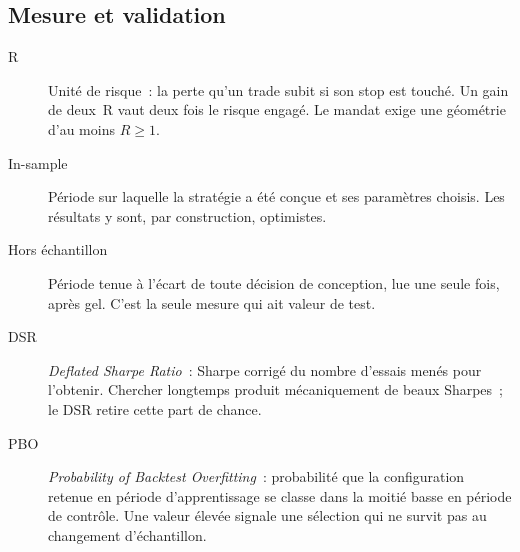\subsection{Mesure et validation}

\begin{description}
  \item[R] Unité de risque~: la perte qu'un trade subit si son stop est
  touché. Un gain de deux~R vaut deux fois le risque engagé. Le mandat exige
  une géométrie d'au moins $R \geq 1$.
  \item[In-sample] Période sur laquelle la stratégie a été conçue et ses
  paramètres choisis. Les résultats y sont, par construction, optimistes.
  \item[Hors échantillon] Période tenue à l'écart de toute décision de
  conception, lue une seule fois, après gel. C'est la seule mesure qui ait
  valeur de test.
  \item[DSR] \emph{Deflated Sharpe Ratio}~: Sharpe corrigé du nombre d'essais
  menés pour l'obtenir. Chercher longtemps produit mécaniquement de beaux
  Sharpes~; le DSR retire cette part de chance.
  \item[PBO] \emph{Probability of Backtest Overfitting}~: probabilité que la
  configuration retenue en période d'apprentissage se classe dans la moitié
  basse en période de contrôle. Une valeur élevée signale une sélection qui ne
  survit pas au changement d'échantillon.
\end{description}
